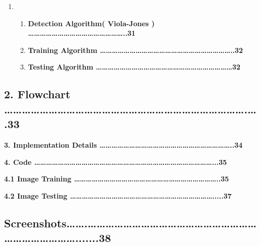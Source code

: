 \documentclass{article} %
\begin{document}
\begin{enumerate}
\item \begin{enumerate}
\item \textbf{ Detection Algorithm( Viola-Jones ) {\dots}{\dots}{\dots}{\dots}{\dots}{\dots}{\dots}{\dots}{\dots}{\dots}{\dots}{\dots}{\dots}{\dots}{\dots}{\dots}..31}

\item \textbf{ Training Algorithm   {\dots}{\dots}{\dots}{\dots}{\dots}{\dots}{\dots}{\dots}{\dots}{\dots}{\dots}{\dots}{\dots}{\dots}{\dots}{\dots}{\dots}{\dots}{\dots}{\dots}{\dots}{\dots}..32}

\item \textbf{ Testing Algorithm    {\dots}{\dots}{\dots}{\dots}{\dots}{\dots}{\dots}{\dots}{\dots}{\dots}{\dots}{\dots}{\dots}{\dots}{\dots}{\dots}{\dots}{\dots}{\dots}{\dots}{\dots}{\dots}{\dots}32}
\end{enumerate}
\end{enumerate}

\noindent 
\subsection{2. Flowchart {\dots}{\dots}{\dots}{\dots}{\dots}{\dots}{\dots}{\dots}{\dots}{\dots}{\dots}{\dots}{\dots}{\dots}{\dots}{\dots}{\dots}{\dots}{\dots}{\dots}{\dots}{\dots}{\dots}{\dots}{\dots}{\dots}{\dots}.{\dots}.33}

\noindent \textbf{       3. Implementation Details  {\dots}{\dots}{\dots}{\dots}{\dots}{\dots}{\dots}{\dots}{\dots}{\dots}{\dots}{\dots}{\dots}{\dots}{\dots}{\dots}{\dots}{\dots}{\dots}{\dots}{\dots}{\dots}..34}

\noindent \textbf{       4. Code {\dots}{\dots}{\dots}{\dots}{\dots}{\dots}{\dots}{\dots}{\dots}{\dots}{\dots}{\dots}{\dots}{\dots}{\dots}{\dots}{\dots}{\dots}{\dots}{\dots}{\dots}{\dots}{\dots}{\dots}{\dots}{\dots}{\dots}{\dots}{\dots}{\dots}...35}

\textbf{ 4.1 Image Training {\dots}{\dots}{\dots}{\dots}{\dots}{\dots}{\dots}{\dots}{\dots}{\dots}{\dots}{\dots}{\dots}{\dots}{\dots}{\dots}{\dots}{\dots}{\dots}{\dots}{\dots}{\dots}{\dots}{\dots}..35}

\textbf{ 4.2 Image Testing {\dots}{\dots}{\dots}{\dots}{\dots}{\dots}{\dots}{\dots}{\dots}{\dots}{\dots}{\dots}{\dots}{\dots}{\dots}{\dots}{\dots}{\dots}{\dots}{\dots}{\dots}{\dots}{\dots}{\dots}.....37}

\noindent 
\subsection{Screenshots{\dots}{\dots}.{\dots}{\dots}{\dots}{\dots}{\dots}{\dots}{\dots}{\dots}{\dots}{\dots}{\dots}{\dots}{\dots}{\dots}{\dots}{\dots}{\dots}{\dots}{\dots}{\dots}{\dots}{\dots}{\dots}{\dots}{\dots}{\dots}{\dots}.......38}
\end{document}
